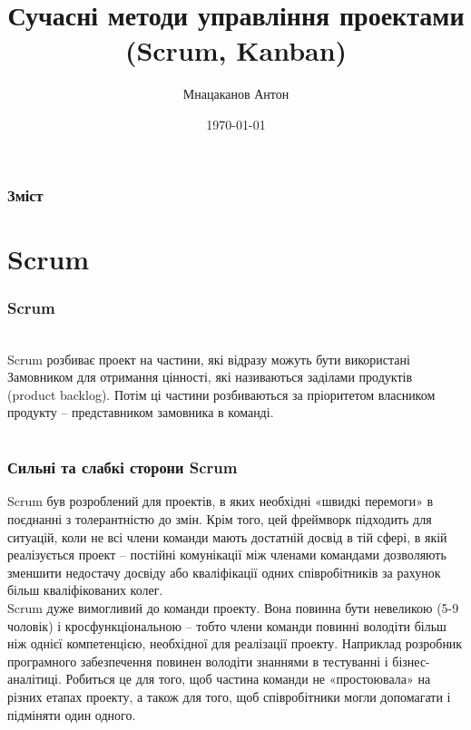 \documentclass{beamer}
\title{Сучасні методи управління проектами (Scrum, Kanban)}
\author{Мнацаканов Антон}
\institute[КПІ] %
{
  Національний технічний університет України\\
  "Київський політехнічний інститут імені Ігоря Сікорського"
}
\date{\today}
\begin{document}
\frame{\titlepage}


\begin{frame}
\frametitle{Зміст}
\tableofcontents
\end{frame}







\section{Scrum}
\begin{frame}
\frametitle{Scrum}
\\
Scrum розбиває проект на частини, які відразу можуть бути використані Замовником для отримання цінності, які називаються заділами продуктів (product backlog). Потім ці частини розбиваються за пріоритетом власником продукту – представником замовника в команді. 
\end{frame}


\section{}
\begin{frame}
\frametitle{Сильні та слабкі сторони Scrum }
Scrum був розроблений для проектів, в яких необхідні «швидкі перемоги» в поєднанні з толерантністю до змін. Крім того, цей фреймворк підходить для ситуацій, коли не всі члени команди мають достатній досвід в тій сфері, в якій реалізується проект – постійні комунікації між членами командами дозволяють зменшити недостачу досвіду або кваліфікації одних співробітників за рахунок більш кваліфікованих колег.\\ 

Scrum дуже вимогливий до команди проекту. Вона повинна бути невеликою (5-9 чоловік) і кросфункціональною – тобто члени команди повинні володіти більш ніж однієї компетенцією, необхідної для реалізації проекту. Наприклад розробник програмного забезпечення повинен володіти знаннями в тестуванні і бізнес-аналітиці. Робиться це для того, щоб частина команди не «простоювала» на різних етапах проекту, а також для того, щоб співробітники могли допомагати і підміняти один одного.
\end{frame}
\end{document}
